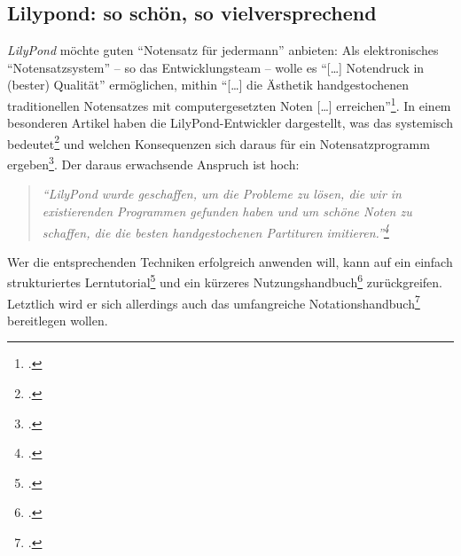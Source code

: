 %
%
%



\subsection{Lilypond: so schön, so vielversprechend}


\textit{LilyPond} möchte guten \enquote{Notensatz für jedermann} anbieten: Als
elektronisches \enquote{Notensatzsystem} -- so das Entwicklungsteam -- wolle es
\enquote{[\ldots] Notendruck in (bester) Qualität} ermöglichen, mithin
\enquote{[\ldots] die Ästhetik handgestochenen traditionellen Notensatzes mit
computergesetzten Noten [\ldots] erreichen}\footcite[vgl.][\nopage
wp]{LilyPond2018a}. In einem besonderen Artikel haben die LilyPond-Entwickler
dargestellt, was das systemisch bedeutet\footcite[vgl.][5ff]{LilyPond2018d} und
welchen Konsequenzen sich daraus für ein Notensatzprogramm
ergeben\footcite[vgl.][8ff]{LilyPond2018d}. Der daraus erwachsende Anspruch ist
hoch:

\begin{quote}\textit{\enquote{LilyPond wurde geschaffen, um die Probleme zu
lösen, die wir in existierenden Programmen gefunden haben und um schöne Noten zu
schaffen, die die besten handgestochenen Partituren
imitieren.}\footcite[vgl.][2]{LilyPond2018d} }
\end{quote}

Wer die entsprechenden Techniken erfolgreich anwenden will, kann auf ein einfach
strukturiertes Lerntutorial\footcite[vgl.][20ff]{LilyPond2018b} und ein kürzeres
Nutzungshandbuch\footcite[vgl.][1ff]{LilyPond2018e} zurückgreifen. Letztlich
wird er sich allerdings auch das umfangreiche
Notationshandbuch\footcite[vgl.][1ff]{LilyPond2018c} bereitlegen wollen.

